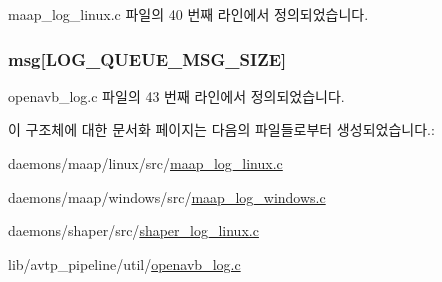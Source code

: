 maap\+\_\+log\+\_\+linux.\+c 파일의 40 번째 라인에서 정의되었습니다.

\subsubsection[{\texorpdfstring{msg}{msg}}]{ msg\mbox{[}{\bf L\+O\+G\+\_\+\+Q\+U\+E\+U\+E\+\_\+\+M\+S\+G\+\_\+\+S\+I\+ZE}\mbox{]}}\hypertarget{structlog__queue__item__t_ae1f33cba442b6de8afc7645e33d76f54}{}\label{structlog__queue__item__t_ae1f33cba442b6de8afc7645e33d76f54}


openavb\+\_\+log.\+c 파일의 43 번째 라인에서 정의되었습니다.



이 구조체에 대한 문서화 페이지는 다음의 파일들로부터 생성되었습니다.\+:\begin{DoxyCompactItemize}
\item 
daemons/maap/linux/src/\hyperlink{maap__log__linux_8c}{maap\+\_\+log\+\_\+linux.\+c}\item 
daemons/maap/windows/src/\hyperlink{maap__log__windows_8c}{maap\+\_\+log\+\_\+windows.\+c}\item 
daemons/shaper/src/\hyperlink{shaper__log__linux_8c}{shaper\+\_\+log\+\_\+linux.\+c}\item 
lib/avtp\+\_\+pipeline/util/\hyperlink{openavb__log_8c}{openavb\+\_\+log.\+c}\end{DoxyCompactItemize}
